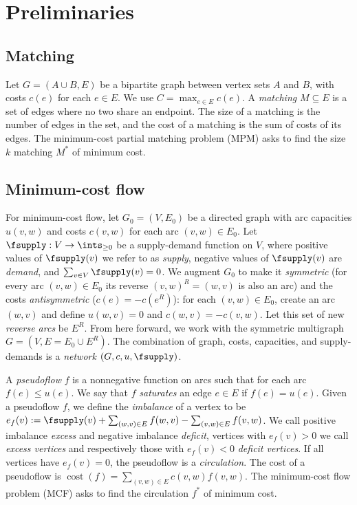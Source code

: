 \documentclass[11pt]{article}
\theoremstyle{plain}
\def\cost{\operatorname{cost}}
\begin{document}

\section{Preliminaries}
\label{section:prelim}

\subsection{Matching}

Let $G = (A \cup B, E)$ be a bipartite graph between vertex sets $A$ and $B$,
with costs $c(e)$ for each $e \in E$.
We use $C = \max_{e \in E} c(e)$.
A \emph{matching} $M \subseteq E$ is a set of edges where no two share an 
endpoint.
The size of a matching is the number of edges in the set, and the cost of a 
matching is the sum of costs of its edges.
The minimum-cost partial matching problem (MPM) asks to find the size $k$ 
matching $M^*$ of minimum cost.

\subsection{Minimum-cost flow}

For minimum-cost flow, let $G_0 = (V, E_0)$ be a directed graph with arc 
capacities $u(v, w)$ and costs $c(v, w)$ for each arc $(v, w) \in E_0$. 
Let $\fsupply: V \to \ints_{\geq 0}$ be a supply-demand function on $V$,
where positive values of $\fsupply(v)$ we refer to as \emph{supply},
negative values of $\fsupply(v)$ are \emph{demand}, and 
$\sum_{v \in V} \fsupply(v) = 0$.
We augment $G_0$ to make it \emph{symmetric} (for every arc $(v, w) \in E_0$ 
its reverse $(v, w)^R = (w, v)$ is also an arc) and the costs 
\emph{antisymmetric} ($c(e) = -c(e^R)$): for each $(v, w) \in E_0$, create an 
arc $(w, v)$ and define $u(w, v) = 0$ and $c(w, v) = -c(v, w)$.
Let this set of new \emph{reverse arcs} be $E^R$.
From here forward, we work with the symmetric multigraph 
$G = (V, E = E_0 \cup E^R)$.
The combination of graph, costs, capacities, and supply-demands is a 
\emph{network} $(G, c, u, \fsupply)$.

A \emph{pseudoflow} $f$ is a nonnegative function on arcs such that for each 
arc $f(e) \leq u(e)$.
We say that $f$ \emph{saturates} an edge $e \in E$ if $f(e) = u(e)$.
Given a pseudoflow $f$, we define the \emph{imbalance} of a vertex to be
$e_f(v) := \fsupply(v) + \sum_{(w, v) \in E}{f(w, v)} - \sum_{(v, w) \in E}{f(v, w)}$.
We call positive imbalance \emph{excess} and negative imbalance \emph{deficit},
vertices with $e_f(v) > 0$ we call \emph{excess vertices} and respectively 
those with $e_f(v) < 0$ \emph{deficit vertices}.
If all vertices have $e_f(v) = 0$, the pseudoflow is a \emph{circulation}.
The cost of a pseudoflow is $\cost(f) = \sum_{(v, w) \in E} c(v, w) f(v, w)$.
The minimum-cost flow problem (MCF) asks to find the circulation $f^*$ of 
minimum cost.
\end{document}
